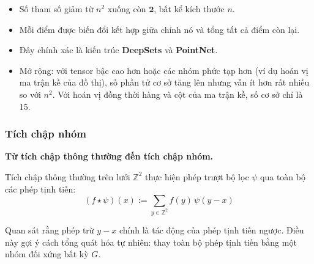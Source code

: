 \begin{itemize}
    \item Số tham số giảm từ $n^2$ xuống còn $\mathbf{2}$, bất kể kích thước $n$.
    \item Mỗi điểm được biến đổi kết hợp giữa chính nó và tổng tất cả điểm còn lại.
    \item Đây chính xác là kiến trúc \textbf{DeepSets} và \textbf{PointNet}.
    \item Mở rộng: với tensor bậc cao hơn hoặc các nhóm phức tạp hơn (ví dụ hoán vị ma trận kề của đồ thị), số phần tử cơ sở tăng lên nhưng vẫn ít hơn rất nhiều so với $n^2$. Với hoán vị đồng thời hàng và cột của ma trận kề, số cơ sở chỉ là 15.
\end{itemize}


\subsubsection{Tích chập nhóm}
\label{subsubsec:group-convolution}

\textbf{Từ tích chập thông thường đến tích chập nhóm.}

Tích chập thông thường trên lưới $\mathbb{Z}^2$ thực hiện phép trượt bộ lọc $\psi$ qua toàn bộ các phép tịnh tiến:
\begin{equation}
    (f \star \psi)(x) := \sum_{y \in \mathbb{Z}^2} f(y)\, \psi(y - x)
    \label{eq:regular-conv}
\end{equation}

Quan sát rằng phép trừ $y - x$ chính là tác động của phép tịnh tiến ngược. Điều này gợi ý cách tổng quát hóa tự nhiên: thay toàn bộ phép tịnh tiến bằng một nhóm đối xứng bất kỳ $G$.

